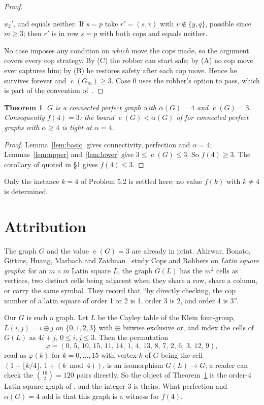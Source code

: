 \documentclass[11pt]{amsart}
\newtheorem{theorem}{Theorem}
\theoremstyle{definition}
\DeclareMathOperator{\cop}{c}
\newcommand{\al}{\alpha}
\newcommand{\Gwit}{G}
\begin{document}
\begin{proof}
\begin{description}
\begin{description}
    $u_2'$, and equals neither. If $s=p$ take $r'=(s,v)$ with
    $v\notin\{y,q\}$, possible since $m\ge3$; then $r'$ is in row $s=p$ with
    both cops and equals neither.
  \end{description}
\end{description}
No case imposes any condition on \emph{which} move the cops made, so the
argument covers every cop strategy. By (C) the robber can start safe; by (A)
no cop move ever captures him; by (B) he restores safety after each cop move.
Hence he survives forever and $\cop(\Gwit_m)\ge3$. Case 0 uses the robber's
option to pass, which is part of the convention of~\cite{CZ}.
\end{proof}

\begin{theorem}\label{thm:main}
$\Gwit$ is a connected perfect graph with $\al(\Gwit)=4$ and
$\cop(\Gwit)=3$. Consequently $f(4)=3$: the bound $\cop(G)<\al(G)$ of
\cite{CZ} for connected perfect graphs with $\al\ge4$ is tight at $\al=4$.
\end{theorem}

\begin{proof}
Lemma~\ref{lem:basic} gives connectivity, perfection and $\al=4$;
Lemmas~\ref{lem:upper} and~\ref{lem:lower} give $3\le\cop(\Gwit)\le3$. So
$f(4)\ge3$. The corollary of \cite{CZ} quoted in \S1 gives $f(4)\le3$.
\end{proof}

Only the instance $k=4$ of Problem 5.2 is settled here; no value $f(k)$ with
$k\neq4$ is determined.

\section{Attribution}\label{sec:prior}

The graph $\Gwit$ and the value $\cop(\Gwit)=3$ are already in print. Ahirwar,
Bonato, Gittins, Huang, Marbach and Zaidman~\cite{Latin} study Cops and
Robbers on \emph{Latin square graphs}: for an $m\times m$ Latin square $L$,
the graph $G(L)$ has the $m^2$ cells as vertices, two distinct cells being
adjacent when they share a row, share a column, or carry the same symbol.
They record that ``by directly checking, the cop number of a latin square of
order 1 or 2 is 1, order 3 is 2, and order 4 is 3''.

Our $\Gwit$ is such a graph. Let $L$ be the Cayley table of the Klein
four-group, $L(i,j)=i\oplus j$ on $\{0,1,2,3\}$ with $\oplus$ bitwise
exclusive or, and index the cells of $G(L)$ as $4i+j$, $0\le i,j\le3$. Then
the permutation
\[
  \varphi=(0,\,5,\,10,\,15,\,11,\,14,\,1,\,4,\,13,\,8,\,7,\,2,\,6,\,3,\,12,\,9),
\]
read as $\varphi(k)$ for $k=0,\dots,15$ with vertex $k$ of $\Gwit$ being the
cell $(1+\lfloor k/4\rfloor,\,1+(k\bmod4))$, is an isomorphism
$G(L)\to\Gwit$; a reader can check the $\binom{16}{2}=120$ pairs directly. So
the object of Theorem~\ref{thm:main} is the order-$4$ Latin square graph of
\cite{Latin}, and the integer $3$ is theirs. What perfection and
$\al(\Gwit)=4$ add is that this graph is a witness for $f(4)$.
\end{document}
